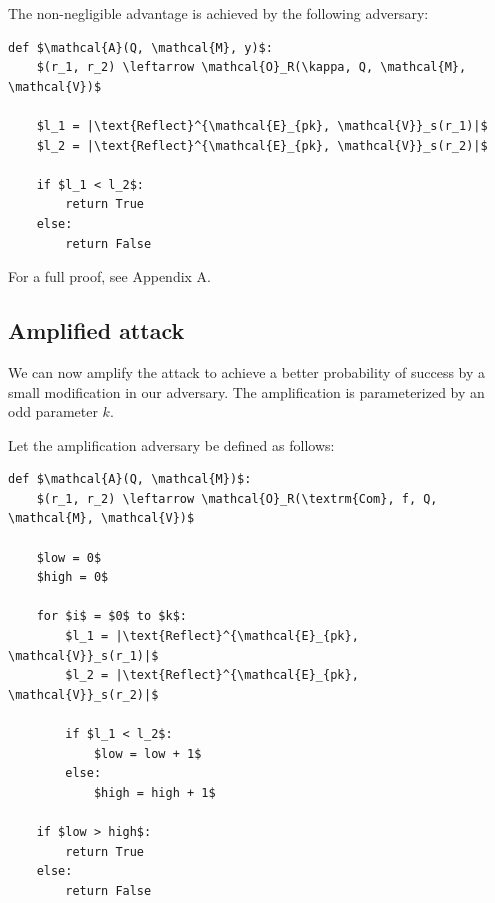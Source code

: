 \documentclass[conference, letterpaper, 10pt]{IEEEtran}
\begin{document}
The non-negligible advantage is achieved by the following adversary:

\begin{lstlisting}[texcl,mathescape,basicstyle=\small]
def $\mathcal{A}(Q, \mathcal{M}, y)$:
    $(r_1, r_2) \leftarrow \mathcal{O}_R(\kappa, Q, \mathcal{M}, \mathcal{V})$

    $l_1 = |\text{Reflect}^{\mathcal{E}_{pk}, \mathcal{V}}_s(r_1)|$
    $l_2 = |\text{Reflect}^{\mathcal{E}_{pk}, \mathcal{V}}_s(r_2)|$

    if $l_1 < l_2$:
        return True
    else:
        return False
\end{lstlisting}

For a full proof, see Appendix A.

\subsection{Amplified attack}\label{subsec:amplification}

We can now amplify the attack to achieve a better probability of success by a small modification in our adversary.
The amplification is parameterized by an odd parameter $k$.

Let the amplification adversary be defined as follows:

\begin{lstlisting}[texcl,mathescape,basicstyle=\small]
def $\mathcal{A}(Q, \mathcal{M})$:
    $(r_1, r_2) \leftarrow \mathcal{O}_R(\textrm{Com}, f, Q, \mathcal{M}, \mathcal{V})$

    $low = 0$
    $high = 0$

    for $i$ = $0$ to $k$:
        $l_1 = |\text{Reflect}^{\mathcal{E}_{pk}, \mathcal{V}}_s(r_1)|$
        $l_2 = |\text{Reflect}^{\mathcal{E}_{pk}, \mathcal{V}}_s(r_2)|$

        if $l_1 < l_2$:
            $low = low + 1$
        else:
            $high = high + 1$

    if $low > high$:
        return True
    else:
        return False
\end{lstlisting}
\end{document}
